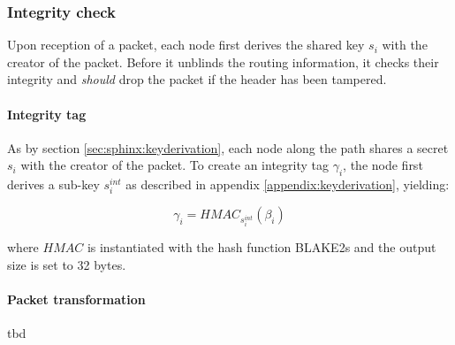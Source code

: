 \subsubsection{Integrity check}
\label{sec:sphinx:integrity}

Upon reception of a packet, each node first derives the shared key $s_i$ with the creator of the packet. Before it unblinds the routing information, it checks their integrity and \textit{should} drop the packet if the header has been tampered.

\paragraph{Integrity tag}

As by section \ref{sec:sphinx:keyderivation}, each node along the path shares a secret $s_i$ with the creator of the packet. To create an integrity tag $\gamma_i$, the node first derives a sub-key $s_i^{int}$ as described in appendix \ref{appendix:keyderivation}, yielding:

$$\gamma_i = HMAC_{s_i^{int}}(\beta_i)$$

where $HMAC$ is instantiated with the hash function \textsf{BLAKE2s} and the output size is set to 32 bytes.

\paragraph{Packet transformation} tbd

